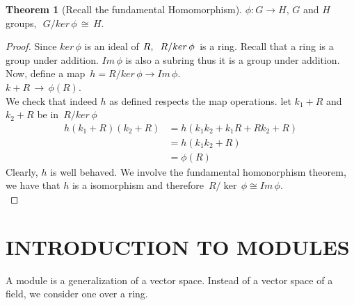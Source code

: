 \documentclass[11pt,a4paper]{article}
\theoremstyle{definition}
\newtheorem{thm}{Theorem}[subsection]
\begin{document}
\begin{thm}[Recall the fundamental Homomorphism]
$\phi : G \longrightarrow H, \, G$ and $H$ groups, $\, \, G\big/ker\, \phi\, \cong\, H$.\\
\end{thm}






\begin{proof}
Since $ker\, \phi$ is an ideal of $R,\hspace{0.2cm} R/ker\, \phi\,$ is a ring. Recall that a  ring is a group under addition. $Im\, \phi$ is also a subring thus it is a group under addition.\\
Now, define a map $\, h = R/ker\, \phi \longrightarrow Im\, \phi$.\\
$k + R \, \longrightarrow \, \phi (R)$.\\
We check that indeed $h$ as defined respects the map operations. let $k_1 + R$ and $k_2 + R$ be in $\, R/ker\, \phi$
\begin{align*}
h(k_1 + R)(k_2 + R) & = h(k_1k_2 + k_1R + Rk_2  + R)\\
& = h(k_1k_2 + R)\\
& = \phi (R)
\end{align*}
Clearly, $h$ is well behaved. We involve the fundamental homonorphism theorem, we have that $h$ is a isomorphism and therefore $\, R/\ker\, \phi \cong Im\, \phi$.\\














\pagebreak
\end{proof}
\section{INTRODUCTION TO MODULES}
A module  is a generalization of a vector space. Instead of a vector space of a field, we consider one over a ring.\\\\
\end{document}
